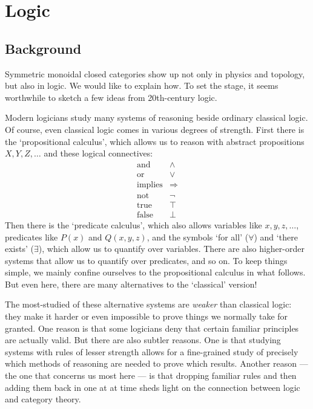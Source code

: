 \documentclass[12pt,twoside,openright]{report}
\renewcommand{\text}{\mbox}
\begin{document}
\section{Logic}
\label{logic}
\EnableBpAbbreviations 

\subsection{Background}
\label{logic_overview}

Symmetric monoidal closed categories show up not only in physics and topology, but also in logic.  We would like to explain how. To set the stage, it seems worthwhile to sketch a few ideas from
20th-century logic.  

Modern logicians study many systems of reasoning beside ordinary classical logic.  Of course, even classical logic comes in various degrees of strength.  First there is the `propositional calculus', which allows us to reason with abstract propositions 
$X, Y, Z, \dots$ and these logical connectives:
\[  
\begin{array}{cc}
\text{and}        & \wedge   \\
\text{or}         & \vee  \\
\text{implies}    & \Rightarrow \\
\text{not}        & \neg  \\
\text{true}       & \top     \\
\text{false}      & \bot
\end{array}
\]
Then there is the `predicate calculus', which also allows variables like $x,y,z, \dots$, predicates like 
$P(x)$ and $Q(x,y,z)$, and the symbols `for all' ($\forall$) 
and `there exists' ($\exists$), which allow us to quantify over variables. There are also higher-order systems that allow us to quantify over predicates, and so on.  To keep things simple, we mainly confine ourselves to the propositional calculus in what follows.  But even here, there are many alternatives to the `classical' version!

The most-studied of these alternative systems are {\it weaker} 
than classical logic: they make it harder or even impossible to prove things we normally take for granted.  One reason is that some logicians deny that certain familiar principles are actually valid.  But there are also subtler reasons.   One is that studying systems with rules of lesser strength allows for a fine-grained study of precisely which methods of reasoning are needed to prove which results.  Another reason --- the one that concerns us most here --- 
is that dropping familiar rules and then adding them back in one at at time sheds light on the connection between logic and category theory.
\end{document}
